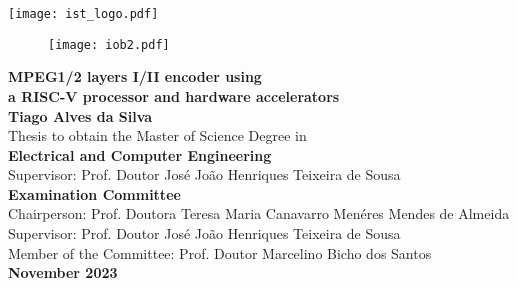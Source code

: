 \documentclass[10pt]{esda}
\title{}
\author{}
\date{}
\begin{document}
\texttt{[image: ist\_logo.pdf]}

\thispagestyle{empty}

\vspace{2.5cm}

\begin{figure}[H]
  \centering
  \texttt{[image: iob2.pdf]}
\end{figure}


\begin{onehalfspace}

\begin{center}
\begin{Large}
  {\bf \Large {MPEG1/2 layers I/II encoder using \\ a RISC-V processor and hardware accelerators}}\\
  \vspace{1cm}
  {\bf \large Tiago Alves da Silva}\\
  \vspace{1cm}
  \normalsize {Thesis to obtain the Master of Science Degree in}\\
  \vspace{0.5cm}
  {\bf \Large {Electrical and Computer Engineering}}\\
  \vspace{1cm}
  \normalsize {Supervisor: Prof. Doutor José João Henriques Teixeira de Sousa}\\
  \vspace{1cm}
  {\bf \large Examination Committee}\\
  \vspace{1cm}
  \normalsize {Chairperson: Prof. Doutora Teresa Maria Canavarro Menéres Mendes de Almeida}\\
  \normalsize {Supervisor: Prof. Doutor José João Henriques Teixeira de Sousa}\\
  \normalsize {Member of the Committee: Prof. Doutor Marcelino Bicho dos Santos}\\

  \vspace{1cm}
  {\bf \large November 2023 }
\end{Large}
\end{center}

\end{onehalfspace}
\end{document}
